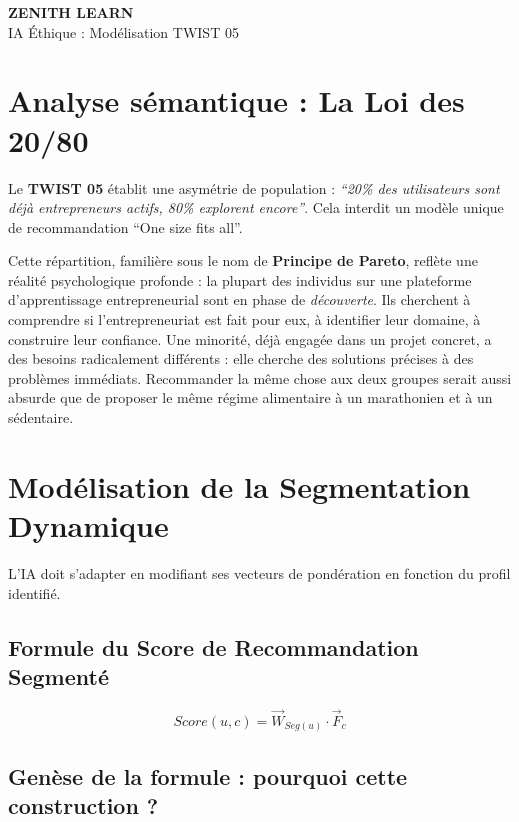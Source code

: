 \documentclass[11pt,a4paper]{article}
\begin{document}
\begin{tcolorbox}[enhanced, colback=BrandDark, colframe=BrandPrimary, arc=10pt, boxrule=2pt, halign=center]
    \vspace{0.3cm}
    {\Huge \bfseries \color{white} ZENITH LEARN} \\
    \vspace{0.2cm}
    {\Large \color{BrandPrimary} IA Éthique : Modélisation TWIST 05} \\
    \vspace{0.3cm}
\end{tcolorbox}

\section{Analyse sémantique : La Loi des 20/80}
Le \textbf{TWIST 05} établit une asymétrie de population : \textit{``20\% des utilisateurs sont déjà entrepreneurs actifs, 80\% explorent encore''}. Cela interdit un modèle unique de recommandation ``One size fits all''.

Cette répartition, familière sous le nom de \textbf{Principe de Pareto}, reflète une réalité psychologique profonde : la plupart des individus sur une plateforme d'apprentissage entrepreneurial sont en phase de \textit{découverte}. Ils cherchent à comprendre si l'entrepreneuriat est fait pour eux, à identifier leur domaine, à construire leur confiance. Une minorité, déjà engagée dans un projet concret, a des besoins radicalement différents : elle cherche des solutions précises à des problèmes immédiats. Recommander la même chose aux deux groupes serait aussi absurde que de proposer le même régime alimentaire à un marathonien et à un sédentaire.

\section{Modélisation de la Segmentation Dynamique}
L'IA doit s'adapter en modifiant ses vecteurs de pondération en fonction du profil identifié.

\subsection{Formule du Score de Recommandation Segmenté}
\begin{equation}
Score(u, c) = \vec{W}_{Seg(u)} \cdot \vec{F}_c
\end{equation}

\subsection{Genèse de la formule : pourquoi cette construction ?}
\end{document}
